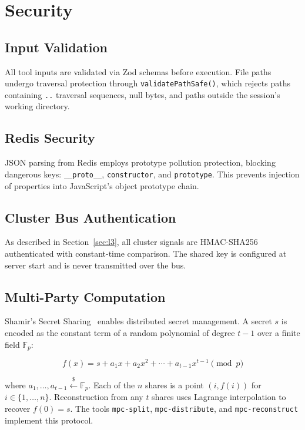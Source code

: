 \documentclass[journal,10pt]{IEEEtran}
\newcommand{\code}[1]{\texttt{#1}}
\begin{document}
\section{Security}
\label{sec:security}

\subsection{Input Validation}

All tool inputs are validated via Zod schemas before execution. File paths undergo traversal protection through \code{validatePathSafe()}, which rejects paths containing \code{..} traversal sequences, null bytes, and paths outside the session's working directory.

\subsection{Redis Security}

JSON parsing from Redis employs prototype pollution protection, blocking dangerous keys: \code{\_\_proto\_\_}, \code{constructor}, and \code{prototype}. This prevents injection of properties into JavaScript's object prototype chain.

\subsection{Cluster Bus Authentication}

As described in Section~\ref{sec:l3}, all cluster signals are HMAC-SHA256 authenticated with constant-time comparison. The shared key is configured at server start and is never transmitted over the bus.

\subsection{Multi-Party Computation}

Shamir's Secret Sharing~\cite{shamir1979} enables distributed secret management. A secret $s$ is encoded as the constant term of a random polynomial of degree $t-1$ over a finite field $\mathbb{F}_p$:

\begin{equation}
f(x) = s + a_1 x + a_2 x^2 + \cdots + a_{t-1} x^{t-1} \pmod{p}
\label{eq:shamir}
\end{equation}

\noindent where $a_1, \ldots, a_{t-1} \overset{\$}{\leftarrow} \mathbb{F}_p$. Each of the $n$ shares is a point $(i, f(i))$ for $i \in \{1, \ldots, n\}$. Reconstruction from any $t$ shares uses Lagrange interpolation to recover $f(0) = s$. The tools \code{mpc-split}, \code{mpc-distribute}, and \code{mpc-reconstruct} implement this protocol.
\end{document}
